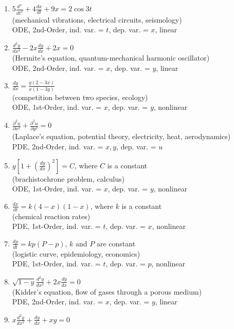 \documentclass[12pt]{report}
\begin{document}
			\begin{enumerate}
				\item $5\frac{d^x}{dt^2}+4\frac{dx}{dt}+9x=2\cos3t$\\ %
				(mechanical vibrations, electrical circuits, seismology)\\
				ODE, 2nd-Order, ind. var. = $t$, dep. var. = $x$, linear
				\item $\frac{d^2y}{dx^2}-2x\frac{dy}{dx}+2x=0$\\ %
				(Hermite's equation, quantum-mechanical harmonic oscillator)\\
				ODE, 2nd-Order, ind. var. = $x$, dep. var. = $y$, linear
				\item $\frac{dy}{dx}=\frac{y(2-3x)}{x(1-3y)}$\\ %
				(competition between two species, ecology)\\
				ODE, 1st-Order, ind. var. = $x$, dep. var. = $y$, nonlinear
				\item $\frac{\partial^2u}{\partial x^2}+\frac{\partial^2u}{\partial y^2}=0$\\ %
				(Laplace's equation, potential theory, electricity, heat, aerodynamics)\\
				PDE, 2nd-Order, ind. var. = $x,y$, dep. var. = $u$
				\item $y[1+(\frac{dy}{dx})^2]=C$, where $C$ is a constant\\ %
				(brachistochrone problem, calculus)\\
				ODE, 1st-Order, ind. var. = $x$, dep. var. = $y$, nonlinear
				\item $\frac{dx}{dt}=k(4-x)(1-x)$, where $k$ is a constant\\ %
				(chemical reaction rates)\\
				PDE, 1st-Order, ind. var. = $t$, dep. var. = $x$, nonlinear
				\item $\frac{dp}{dt}=kp(P-p)$, $k$ and $P$ are constant\\ %
				(logistic curve, epidemiology, economics)\\
				PDE, 1st-Order, ind. var. = $t$, dep. var. = $p$, nonlinear
				\item $\sqrt{1-y}\frac{d^2y}{dx^2}+2x\frac{dy}{dx}=0$\\ %
				(Kidder's equation, flow of gases through a porous medium)\\
				PDE, 2nd-Order, ind. var. = $x$, dep. var. = $y$, linear
				\item $x\frac{d^2y}{dx^2}+\frac{dy}{dx}+xy=0$\\ %

\end{enumerate}
\end{document}
